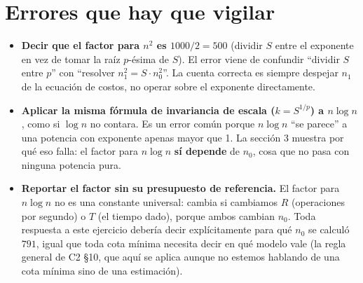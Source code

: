 \documentclass[11pt]{article}
\begin{document}
\section*{Errores que hay que vigilar}

\begin{alerta}{}
\begin{itemize}[leftmargin=14pt]
\item \textbf{Decir que el factor para $n^2$ es $1000/2=500$} (dividir $S$ entre el exponente en vez de tomar la
raíz $p$-ésima de $S$). El error viene de confundir ``dividir $S$ entre $p$'' con ``resolver
$n_1^2=S\cdot n_0^2$''. La cuenta correcta es siempre despejar $n_1$ de la ecuación de costos, no operar
sobre el exponente directamente.
\item \textbf{Aplicar la misma fórmula de invariancia de escala ($k=S^{1/p}$) a $n\log n$}, como si
$\log n$ no contara. Es un error común porque $n\log n$ ``se parece'' a una potencia con exponente apenas
mayor que 1. La sección 3 muestra por qué eso falla: el factor para $n\log n$ \textbf{sí depende} de
$n_0$, cosa que no pasa con ninguna potencia pura.
\item \textbf{Reportar el factor sin su presupuesto de referencia.} El factor para $n\log n$ no es una
constante universal: cambia si cambiamos $R$ (operaciones por segundo) o $T$ (el tiempo dado), porque
ambos cambian $n_0$. Toda respuesta a este ejercicio debería decir explícitamente para qué $n_0$ se
calculó $791$, igual que toda cota mínima necesita decir en qué modelo vale (la regla general de C2 §10,
que aquí se aplica aunque no estemos hablando de una cota mínima sino de una estimación).
\end{itemize}
\end{alerta}
\end{document}
